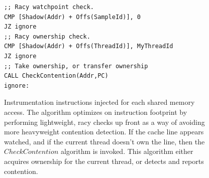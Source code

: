 \documentclass[letterpaper,twocolumn,10pt]{article}
\begin{document}
%
%
%



\begin{figure}
\lstset{language=[x64]Assembler}
\begin{lstlisting}[basicstyle=\footnotesize\ttfamily]
;; Racy watchpoint check.
CMP [Shadow(Addr) + Offs(SampleId)], 0
JZ ignore
;; Racy ownership check.
CMP [Shadow(Addr) + Offs(ThreadId)], MyThreadId
JZ ignore
;; Take ownership, or transfer ownership
CALL CheckContention(Addr,PC)
ignore:
\end{lstlisting}
\caption{\label{fig:inline_assembly}Instrumentation instructions injected for each shared memory access. The algorithm %
optimizes on instruction footprint by performing lightweight, racy checks up front as a way of avoiding more heavyweight %
contention detection. If the cache line appears watched, and if the current thread doesn't own the line, then the %
$CheckContention$ algorithm is invoked. This algorithm either acquires ownership for the current thread, or detects and %
reports contention.}
\end{figure}
\end{document}
